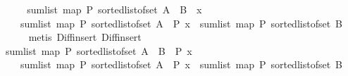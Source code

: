 \begin{isabellebody}
\ \ \isamarkupfalse%
\ \isamarkupfalse%
\ {\isachardoublequoteopen}sum{\isacharunderscore}{\kern0pt}list\ {\isacharparenleft}{\kern0pt}map\ P\ {\isacharparenleft}{\kern0pt}sorted{\isacharunderscore}{\kern0pt}list{\isacharunderscore}{\kern0pt}of{\isacharunderscore}{\kern0pt}set\ {\isacharparenleft}{\kern0pt}{\isacharparenleft}{\kern0pt}A\ {\isacharminus}{\kern0pt}\ B{\isacharparenright}{\kern0pt}\ {\isacharminus}{\kern0pt}\ {\isacharbraceleft}{\kern0pt}x{\isacharbraceright}{\kern0pt}{\isacharparenright}{\kern0pt}{\isacharparenright}{\kern0pt}{\isacharparenright}{\kern0pt}\ {\isacharequal}{\kern0pt}\isanewline
\ \ \ \ sum{\isacharunderscore}{\kern0pt}list\ {\isacharparenleft}{\kern0pt}map\ P\ {\isacharparenleft}{\kern0pt}sorted{\isacharunderscore}{\kern0pt}list{\isacharunderscore}{\kern0pt}of{\isacharunderscore}{\kern0pt}set\ {\isacharparenleft}{\kern0pt}A{\isacharparenright}{\kern0pt}{\isacharparenright}{\kern0pt}{\isacharparenright}{\kern0pt}\ {\isacharminus}{\kern0pt}\ P\ x\ {\isacharminus}{\kern0pt}\ sum{\isacharunderscore}{\kern0pt}list\ {\isacharparenleft}{\kern0pt}map\ P\ {\isacharparenleft}{\kern0pt}sorted{\isacharunderscore}{\kern0pt}list{\isacharunderscore}{\kern0pt}of{\isacharunderscore}{\kern0pt}set\ B{\isacharparenright}{\kern0pt}{\isacharparenright}{\kern0pt}{\isachardoublequoteclose}\isanewline
\ \ \ \ \isamarkupfalse%
\ {\isacharparenleft}{\kern0pt}metis\ Diff{\isacharunderscore}{\kern0pt}insert\ Diff{\isacharunderscore}{\kern0pt}insert{}{\isacharparenright}{\kern0pt}\ \isanewline
\ \ \isamarkupfalse%
\ \isamarkupfalse%
\ {\isachardoublequoteopen}sum{\isacharunderscore}{\kern0pt}list\ {\isacharparenleft}{\kern0pt}map\ P\ {\isacharparenleft}{\kern0pt}sorted{\isacharunderscore}{\kern0pt}list{\isacharunderscore}{\kern0pt}of{\isacharunderscore}{\kern0pt}set\ {\isacharparenleft}{\kern0pt}{\isacharparenleft}{\kern0pt}A\ {\isacharminus}{\kern0pt}\ B{\isacharparenright}{\kern0pt}{\isacharparenright}{\kern0pt}{\isacharparenright}{\kern0pt}{\isacharparenright}{\kern0pt}\ {\isacharminus}{\kern0pt}\ P\ x\ {\isacharequal}{\kern0pt}\isanewline
\ \ \ \ sum{\isacharunderscore}{\kern0pt}list\ {\isacharparenleft}{\kern0pt}map\ P\ {\isacharparenleft}{\kern0pt}sorted{\isacharunderscore}{\kern0pt}list{\isacharunderscore}{\kern0pt}of{\isacharunderscore}{\kern0pt}set\ {\isacharparenleft}{\kern0pt}A{\isacharparenright}{\kern0pt}{\isacharparenright}{\kern0pt}{\isacharparenright}{\kern0pt}\ {\isacharminus}{\kern0pt}\ P\ x\ {\isacharminus}{\kern0pt}\ sum{\isacharunderscore}{\kern0pt}list\ {\isacharparenleft}{\kern0pt}map\ P\ {\isacharparenleft}{\kern0pt}sorted{\isacharunderscore}{\kern0pt}list{\isacharunderscore}{\kern0pt}of{\isacharunderscore}{\kern0pt}set\ B{\isacharparenright}{\kern0pt}{\isacharparenright}{\kern0pt}{\isachardoublequoteclose}\isanewline

\end{isabellebody}
